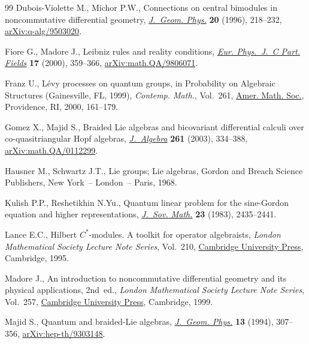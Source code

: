 \documentclass[10pt,a4paper]{amsart}
\numberwithin{equation}{section}
\newcommand{\<}{\langle}
\renewcommand{\>}{\rangle}
\begin{document}
\begin{thebibliography}{99}
Dubois-Violette M., Michor P.W., Connections on central bimodules in
 noncommutative differential geometry, \href{https://doi.org/10.1016/0393-0440(95)00057-7}{\textit{J.~Geom. Phys.}} \textbf{20}
 (1996), 218--232, \href{https://arxiv.org/abs/q-alg/9503020}{arXiv:q-alg/9503020}.

Fiore G., Madore J., Leibniz rules and reality conditions, \href{https://doi.org/10.1007/s100520000470}{\textit{Eur.
 Phys.~J.~C Part. Fields}} \textbf{17} (2000), 359--366,
 \href{https://arxiv.org/abs/math.QA/9806071}{arXiv:math.QA/9806071}.

Franz U., L\'evy processes on quantum groups, in Probability on Algebraic
 Structures ({G}ainesville, {FL}, 1999), \textit{Contemp. Math.}, Vol.~261,
 \href{https://doi.org/10.1090/conm/261/04139}{Amer. Math. Soc.}, Providence, RI, 2000, 161--179.

Gomez X., Majid S., Braided {L}ie algebras and bicovariant differential calculi
 over co-quasitriangular {H}opf algebras, \href{https://doi.org/10.1016/S0021-8693(02)00580-X}{\textit{J.~Algebra}} \textbf{261}
 (2003), 334--388, \href{https://arxiv.org/abs/math.QA/0112299}{arXiv:math.QA/0112299}.

Hausner M., Schwartz J.T., Lie groups; {L}ie algebras, Gordon and Breach
 Science Publishers, New York~-- London~-- Paris, 1968.

Kulish P.P., Reshetikhin N.Yu., Quantum linear problem for the sine-{G}ordon
 equation and higher representations, \href{https://doi.org/10.1007/BF01084171}{\textit{J.~Sov. Math.}} \textbf{23}
 (1983), 2435--2441.

Lance E.C., Hilbert {$C^*$}-modules. A toolkit for operator algebraists,
 \textit{London Mathematical Society Lecture Note Series}, Vol.~210, \href{https://doi.org/10.1017/CBO9780511526206}{Cambridge
 University Press}, Cambridge, 1995.

Madore J., An introduction to noncommutative differential geometry and its
 physical applications, 2nd~ed., \textit{London Mathematical Society Lecture Note
 Series}, Vol.~257, \href{https://doi.org/10.1017/CBO9780511569357}{Cambridge University Press}, Cambridge, 1999.

Majid S., Quantum and braided-{L}ie algebras, \href{https://doi.org/10.1016/0393-0440(94)90014-0}{\textit{J.~Geom. Phys.}}
 \textbf{13} (1994), 307--356, \href{https://arxiv.org/abs/hep-th/9303148}{arXiv:hep-th/9303148}.


\end{thebibliography}
\end{document}
